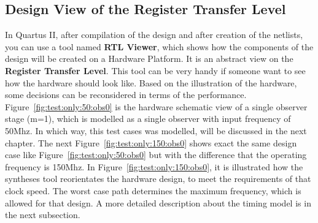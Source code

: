 \subsection{Design View of the Register Transfer Level}
\label{chapter:3:section:2:sub:1}
In Quartus II, after compilation of the design and after creation of the netlists, you can use a tool named \textbf{RTL Viewer}, which shows how
the components of the design will be created on a Hardware Platform. It is an abstract view on the \textbf{Register Transfer Level}. 
This tool can be very handy if someone want to see how the hardware should look like. Based on the illustration of the hardware, some decisions can
be reconsidered in terms of the performance. \newline
Figure~\ref{fig:test:only:50:obs0} is the hardware schematic view of a single observer stage (m=1), which is modelled as a single observer with input frequency of 50Mhz. 
In which way, this test cases was modelled, will be discussed in the next chapter. 
The next Figure~\ref{fig:test:only:150:obs0} shows exact the same design case like Figure~\ref{fig:test:only:50:obs0} but with the difference that the operating frequency is 150Mhz. 
In Figure~\ref{fig:test:only:150:obs0}, it is illustrated how the syntheses tool reorientates the hardware design, 
to meet the requirements of that clock speed. The worst case path determines the maximum frequency, which is allowed for that design. 
A more detailed description about the timing model is in the next subsection. 
